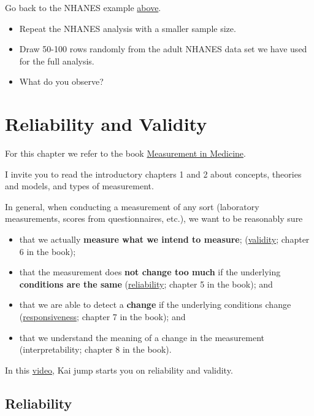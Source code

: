 \documentclass[
]{book}
\providecommand{\tightlist}{%
  \setlength{\itemsep}{0pt}\setlength{\parskip}{0pt}}
\begin{document}
Go back to the NHANES example \hyperref[example_nhanes]{above}.

\begin{itemize}
\tightlist
\item
  Repeat the NHANES analysis with a smaller sample size.
\item
  Draw 50-100 rows randomly from the adult NHANES data set we have used for the full
  analysis.
\item
  What do you observe?
\end{itemize}

\chapter{Reliability and Validity}\label{reliability-and-validity}

For this chapter we refer to the book
\href{https://www.cambridge.org/core/books/measurement-in-medicine/8BD913A1DA0ECCBA951AC4C1F719BCC5}{Measurement in Medicine}.

I invite you to read the introductory chapters 1 and 2 about concepts,
theories and models, and types of measurement.

In general, when conducting a measurement of any sort
(laboratory measurements, scores from questionnaires, etc.),
we want to be reasonably sure

\begin{itemize}
\tightlist
\item
  that we actually \textbf{measure what we intend to measure};
  (\href{https://en.wikipedia.org/wiki/Validity_(statistics)}{validity};
  chapter 6 in the book);
\item
  that the measurement does \textbf{not change too much} if the
  underlying \textbf{conditions are the same}
  (\href{https://en.wikipedia.org/wiki/Reliability_(statistics)}{reliability};
  chapter 5 in the book); and
\item
  that we are able to detect a \textbf{change} if the underlying conditions change
  (\href{https://tinyurl.com/3vdcxy49}{responsiveness}; chapter 7 in the book); and
\item
  that we understand the meaning of a change in the measurement
  (interpretability; chapter 8 in the book).
\end{itemize}

In this \href{https://www.youtube.com/watch?v=KuT2n1w0Ixc&ab_channel=Physiotutors}{video},
Kai jump starts you on reliability and validity.

\section{Reliability}\label{reliability}
\end{document}
